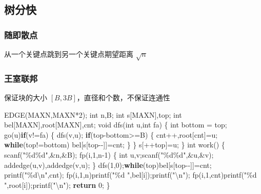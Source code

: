 \documentclass[
]{article}
\newenvironment{Shaded}{}{}
\newcommand{\ControlFlowTok}[1]{\textcolor[rgb]{0.00,0.44,0.13}{\textbf{#1}}}
\newcommand{\DataTypeTok}[1]{\textcolor[rgb]{0.56,0.13,0.00}{#1}}
\newcommand{\DecValTok}[1]{\textcolor[rgb]{0.25,0.63,0.44}{#1}}
\newcommand{\NormalTok}[1]{#1}
\newcommand{\SpecialCharTok}[1]{\textcolor[rgb]{0.25,0.44,0.63}{#1}}
\newcommand{\StringTok}[1]{\textcolor[rgb]{0.25,0.44,0.63}{#1}}
\begin{document}
\hypertarget{ux6811ux5206ux5feb}{%
\subsection{树分快}\label{ux6811ux5206ux5feb}}

\hypertarget{ux968fux5373ux6563ux70b9}{%
\subsubsection{随即散点}\label{ux968fux5373ux6563ux70b9}}

从一个关键点跳到另一个关键点期望距离 \(\sqrt{n}\)

\hypertarget{ux738bux5ba4ux8054ux90a6}{%
\subsubsection{王室联邦}\label{ux738bux5ba4ux8054ux90a6}}

保证块的大小 \([B,3B]\)，直径和个数，不保证连通性

\begin{Shaded}
\begin{Highlighting}[]
\NormalTok{EDGE(MAXN,MAXN*}\DecValTok{2}\NormalTok{);}
\DataTypeTok{int}\NormalTok{ n,B;}
\DataTypeTok{int}\NormalTok{ s[MAXN],top;}
\DataTypeTok{int}\NormalTok{ bel[MAXN],root[MAXN],cnt;}
\DataTypeTok{void}\NormalTok{ dfs(}\DataTypeTok{int}\NormalTok{ u,}\DataTypeTok{int}\NormalTok{ fa)}
\NormalTok{\{}
    \DataTypeTok{int}\NormalTok{ bottom = top; }
\NormalTok{    go(u)}\ControlFlowTok{if}\NormalTok{(v!=fa)}
\NormalTok{    \{}
\NormalTok{        dfs(v,u);}
        \ControlFlowTok{if}\NormalTok{(top{-}bottom\textgreater{}=B)}
\NormalTok{        \{}
\NormalTok{            cnt++,root[cnt]=u;}
            \ControlFlowTok{while}\NormalTok{(top!=bottom)}
\NormalTok{                bel[s[top{-}{-}]]=cnt;}
\NormalTok{        \}}
\NormalTok{    \}}
\NormalTok{    s[++top]=u;}
\NormalTok{\}}
\DataTypeTok{int}\NormalTok{ work()}
\NormalTok{\{}
\NormalTok{    scanf(}\StringTok{"}\SpecialCharTok{\%d\%d}\StringTok{"}\NormalTok{,\&n,\&B);}
\NormalTok{    fp(i,}\DecValTok{1}\NormalTok{,n{-}}\DecValTok{1}\NormalTok{)}
\NormalTok{    \{}
        \DataTypeTok{int}\NormalTok{ u,v;scanf(}\StringTok{"}\SpecialCharTok{\%d\%d}\StringTok{"}\NormalTok{,\&u,\&v);}
\NormalTok{        addedge(u,v),addedge(v,u);}
\NormalTok{    \}}
\NormalTok{    dfs(}\DecValTok{1}\NormalTok{,}\DecValTok{0}\NormalTok{);}\ControlFlowTok{while}\NormalTok{(top)bel[s[top{-}{-}]]=cnt;}
\NormalTok{    printf(}\StringTok{"}\SpecialCharTok{\%d\textbackslash{}n}\StringTok{"}\NormalTok{,cnt);}
\NormalTok{    fp(i,}\DecValTok{1}\NormalTok{,n)printf(}\StringTok{"}\SpecialCharTok{\%d}\StringTok{ "}\NormalTok{,bel[i]);printf(}\StringTok{"}\SpecialCharTok{\textbackslash{}n}\StringTok{"}\NormalTok{);}
\NormalTok{    fp(i,}\DecValTok{1}\NormalTok{,cnt)printf(}\StringTok{"}\SpecialCharTok{\%d}\StringTok{ "}\NormalTok{,root[i]);printf(}\StringTok{"}\SpecialCharTok{\textbackslash{}n}\StringTok{"}\NormalTok{);}
    \ControlFlowTok{return} \DecValTok{0}\NormalTok{;}
\NormalTok{\}}
\end{Highlighting}
\end{Shaded}
\end{document}
